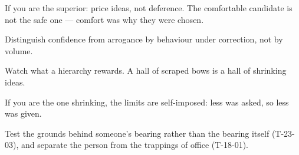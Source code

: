 \begin{countermeasures}
  \item If you are the superior: price ideas, not deference. The comfortable candidate is not the safe one --- comfort was why they were chosen.
  \item Distinguish confidence from arrogance by behaviour under correction, not by volume.
  \item Watch what a hierarchy rewards. A hall of scraped bows is a hall of shrinking ideas.
  \item If you are the one shrinking, the limits are self-imposed: less was asked, so less was given.
  \item Test the grounds behind someone's bearing rather than the bearing itself (T-23-03), and separate the person from the trappings of office (T-18-01).
\end{countermeasures}

\seesources
{}
